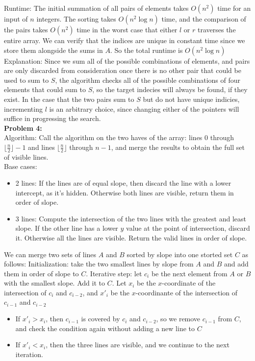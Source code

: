 \documentclass{article}
\begin{document}
Runtime: The initial summation of all pairs of elements takes $O(n^2)$ time for an input of $n$ integers. The sorting takes $O(n^2 \log n)$ time, and the comparison of the pairs takes $O(n^2)$ time in the worst case that either $l$ or $r$ traverses the entire array. We can verify that the indices are unique in constant time since we store them alongside the sums in $A$. So the total runtime is $O(n^2 \log n)$ \\[0.5ex]
Explanation: Since we sum all of the possible combinations of elements, and pairs are only discarded from consideration once there is no other pair that could be used to sum to $S$, the algorithm checks all of the possible combinations of four elements that could sum to $S$, so the target indecies will always be found, if they exist. In the case that the two pairs sum to $S$ but do not have unique indicies, incrementing $l$ is an arbitrary choice, since changing either of the pointers will suffice in progressing the search. \\[1.0ex]
\textbf{Problem 4:} \\[0.5ex]
Algorithm: Call the algorithm on the two haves of the array: lines $0$ through $\lfloor \frac{n}{2} \rfloor - 1$ and lines $\lfloor \frac{n}{2} \rfloor$  through $n - 1$, and merge the results to obtain the full set of visible lines. \\[0.5ex]
Base cases: 
\begin{itemize}
    \item 2 lines: If the lines are of equal slope, then discard the line with a lower intercept, as it's hidden. Otherwise both lines are visible, return them in order of slope.
    \item 3 lines: Compute the intersection of the two lines with the greatest and least slope. If the other line has a lower $y$ value at the point of intersection, discard it. Otherwise all the lines are visible. Return the valid lines in order of slope.
\end{itemize}
We can merge two sets of lines $A$ and $B$ sorted by slope into one storted set $C$ as follows: Initialization: take the two smallest lines by slope from $A$ and $B$ and add them in order of slope to $C$. Iterative step: let $c_i$ be the next element from $A$ or $B$ with the smallest slope. Add it to $C$. Let $x_i$ be the $x$-coordinate of the intersection of $c_i$ and $c_{i - 2}$, and $x'_i$ be the $x$-coordinante of the intersection of $c_{i - 1}$ and $c_{i - 2}$
\begin{itemize}
    \item If $x'_i > x_i$, then $c_{i - 1}$ is covered by $c_i$ and $c_{i - 2}$, so we remove $c_{i - 1}$ from $C$, and check the condition again without adding a new line to $C$
    \item If $x'_i < x_i$, then the three lines are visible, and we continue to the next iteration.
\end{itemize}
\end{document}
